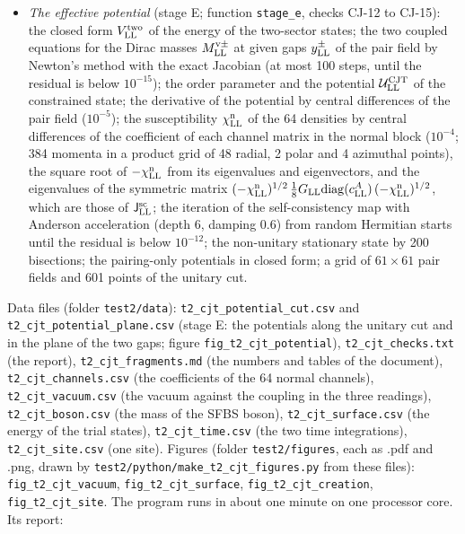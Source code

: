 \documentclass[
  10pt,
]{article}
\begin{document}
\begin{itemize}
  state in the right side; CVODE (Adams-Moulton formulas,
  \(r^{\rm tol}_{\rm LL}=10^{-13}\), \(a^{\rm tol}_{\rm LL}=10^{-15}\))
  through the module \texttt{t2core::cvode}; the frequency of the first
  run from the maximum of the Hann-windowed Fourier sum of the pair
  amplitude (2001 scan points, then a golden-section search), the rate
  of the second from a least-squares line through the logarithm of its
  modulus, between 300 times its initial value and 0.005 times the value
  of the condensed vacuum.
\item
  \emph{The effective potential} (stage E; function \texttt{stage\_e},
  checks CJ-12 to CJ-15): the closed form \(V^{\rm two}_{\rm LL}\) of
  the energy of the two-sector states; the two coupled equations for the
  Dirac masses \(M^{{\rm v}\pm}_{\rm LL}\) at given gaps
  \(y^\pm_{\rm LL}\) of the pair field by Newton's method with the exact
  Jacobian (at most 100 steps, until the residual is below
  \(10^{-15}\)); the order parameter and the potential
  \(\mathcal U^{\rm CJT}_{\rm LL}\) of the constrained state; the
  derivative of the potential by central differences of the pair field
  (\(10^{-5}\)); the susceptibility \(\chi^{\rm n}_{\rm LL}\) of the 64
  densities by central differences of the coefficient of each channel
  matrix in the normal block (\(10^{-4}\); 384 momenta in a product grid
  of 48 radial, 2 polar and 4 azimuthal points), the square root of
  \(-\chi^{\rm n}_{\rm LL}\) from its eigenvalues and eigenvectors, and
  the eigenvalues of the symmetric matrix
  \((-\chi^{\rm n}_{\rm LL})^{1/2}\,\tfrac18G_{\rm LL}\mathrm{diag}(c^A_{\rm LL})\,(-\chi^{\rm n}_{\rm LL})^{1/2}\),
  which are those of \(\mathsf J^{\rm sc}_{\rm LL}\); the iteration of
  the self-consistency map with Anderson acceleration (depth 6, damping
  0.6) from random Hermitian starts until the residual is below
  \(10^{-12}\); the non-unitary stationary state by 200 bisections; the
  pairing-only potentials in closed form; a grid of \(61\times61\) pair
  fields and 601 points of the unitary cut.
\end{itemize}

Data files (folder \texttt{test2/data}):
\texttt{t2\_cjt\_potential\_cut.csv} and
\texttt{t2\_cjt\_potential\_plane.csv} (stage E: the potentials along
the unitary cut and in the plane of the two gaps; figure
\texttt{fig\_t2\_cjt\_potential}), \texttt{t2\_cjt\_checks.txt} (the
report), \texttt{t2\_cjt\_fragments.md} (the numbers and tables of the
document), \texttt{t2\_cjt\_channels.csv} (the coefficients of the 64
normal channels), \texttt{t2\_cjt\_vacuum.csv} (the vacuum against the
coupling in the three readings), \texttt{t2\_cjt\_boson.csv} (the mass
of the SFBS boson), \texttt{t2\_cjt\_surface.csv} (the energy of the
trial states), \texttt{t2\_cjt\_time.csv} (the two time integrations),
\texttt{t2\_cjt\_site.csv} (one site). Figures (folder
\texttt{test2/figures}, each as .pdf and .png, drawn by
\texttt{test2/python/make\_t2\_cjt\_figures.py} from these files):
\texttt{fig\_t2\_cjt\_vacuum}, \texttt{fig\_t2\_cjt\_surface},
\texttt{fig\_t2\_cjt\_creation}, \texttt{fig\_t2\_cjt\_site}. The
program runs in about one minute on one processor core. Its report:
\end{document}
